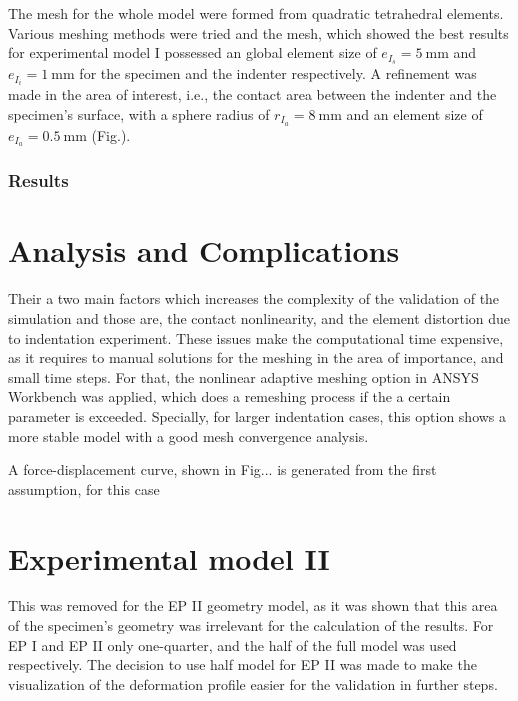 The mesh for the whole model were formed from quadratic tetrahedral elements. 
Various meshing methods were tried and the mesh, which showed the best results for experimental model I 
possessed an global element size of $e_{I_s}=\SI{5}{\milli\meter}$ and $e_{I_i}=\SI{1}{\milli\meter}$ for the specimen 
and the indenter respectively. A refinement was made in the area of interest, i.e., the contact 
area between the indenter and the specimen's surface, with a sphere radius of 
$r_{I_a}=\SI{8}{\milli\meter}$ and an element size of $e_{I_a}=\SI{0.5}{\milli\meter}$ (Fig.). %

\subsubsection*{Results}

\section{Analysis and Complications}
Their a two main factors which increases the complexity of the validation of the simulation
and those are, the contact nonlinearity, and the element distortion due to indentation
 experiment. These issues make the computational time expensive, as it requires to manual 
 solutions for the meshing in the area of importance, and small time steps. 
 For that, 
 the nonlinear adaptive meshing option in ANSYS Workbench was applied, which does a remeshing
 process if the a certain parameter is exceeded.%
Specially, for larger indentation cases, this option shows a more stable model with a 
good mesh convergence analysis.

A force-displacement curve, shown in Fig... is generated from the first assumption, 
for this case 

\section*{Experimental model II}
This was removed for the EP II geometry model, as it was shown that this area 
of the specimen's geometry was irrelevant for the calculation of the results.
For EP I and EP II only one-quarter, and the half of the full model was used respectively.
The decision to use half model for EP II was made to make the visualization of the deformation profile 
easier for the validation in further steps.\\

